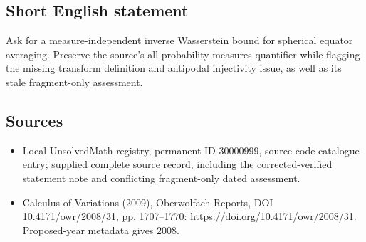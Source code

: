 \documentclass[11pt]{article}
\begin{document}
\subsection{Short English statement}
Ask for a measure-independent inverse Wasserstein bound for spherical equator averaging. Preserve the source's all-probability-measures quantifier while flagging the missing transform definition and antipodal injectivity issue, as well as its stale fragment-only assessment.
\subsection{Sources}
\begin{itemize}
\item Local UnsolvedMath registry, permanent ID 30000999, source code catalogue entry; supplied complete source record, including the corrected-verified statement note and conflicting fragment-only dated assessment.
\item Calculus of Variations (2009), Oberwolfach Reports, DOI 10.4171/owr/2008/31, pp. 1707--1770: \url{https://doi.org/10.4171/owr/2008/31}. Proposed-year metadata gives 2008.
\end{itemize}
\end{document}
